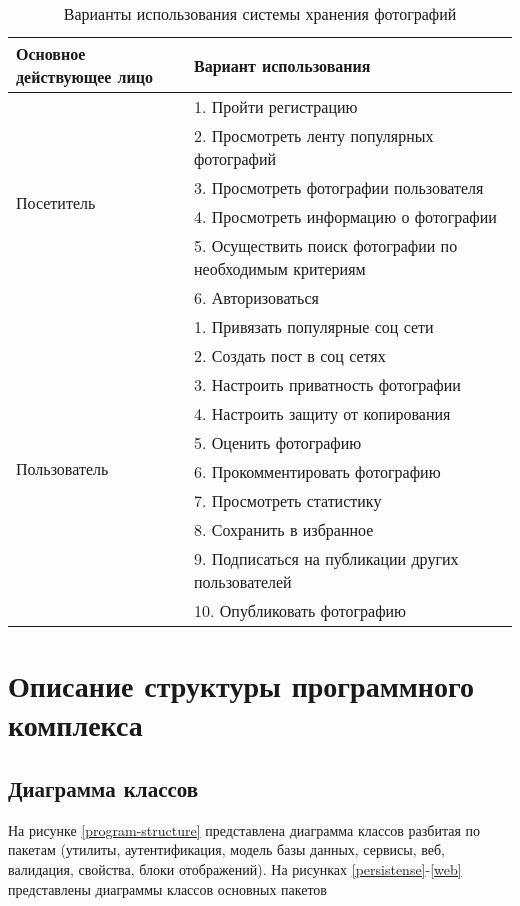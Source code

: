 \begin{table}[H]
  \caption{\onehalfspacing Варианты использования системы хранения фотографий}\label{use-case-table}
  \begin{tabular}{|p{6cm}|p{10cm}|}
  \hline Основное действующее лицо & Вариант использования \\
  \hline \multirow{6}{*}{Посетитель} & 1. Пройти регистрацию \\
  \cline{2-2} & 2. Просмотреть ленту популярных фотографий \\
  \cline{2-2} & 3. Просмотреть фотографии пользователя \\
  \cline{2-2} & 4. Просмотреть информацию о фотографии \\
  \cline{2-2} & 5. Осуществить поиск фотографии по необходимым критериям \\
  \cline{2-2} & 6. Авторизоваться \\
  \hline \multirow{10}{*}{Пользователь} & 1. Привязать популярные соц сети \\
  \cline{2-2} & 2. Создать пост в соц сетях \\
  \cline{2-2} & 3. Настроить приватность фотографии \\
  \cline{2-2} & 4. Настроить защиту от копирования \\
  \cline{2-2} & 5. Оценить фотографию \\
  \cline{2-2} & 6. Прокомментировать фотографию \\
  \cline{2-2} & 7. Просмотреть статистику \\
  \cline{2-2} & 8. Сохранить в избранное \\
  \cline{2-2} & 9. Подписаться на публикации других пользователей \\
  \cline{2-2} & 10. Опубликовать фотографию \\
  \hline
  \end{tabular}
\end{table}

\begin{landscape}
\end{landscape}

\section{Описание структуры программного комплекса}
\subsection{Диаграмма классов}
На рисунке \ref{program-structure} представлена диаграмма классов разбитая по пакетам (утилиты, аутентификация, модель базы данных, сервисы, веб, валидация, свойства, блоки отображений). На рисунках \ref{persistense}-\ref{web} представлены диаграммы классов основных пакетов

